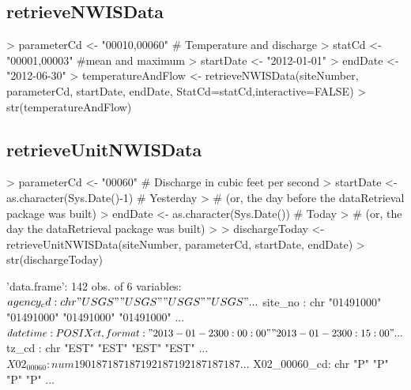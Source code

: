 \documentclass[a4paper,11pt]{article}
\begin{document}
\subsection{retrieveNWISData}
\begin{Schunk}
\begin{Sinput}
> parameterCd <- "00010,00060"  # Temperature and discharge
> statCd <- "00001,00003"  #mean and maximum
> startDate <- "2012-01-01"
> endDate <- "2012-06-30"
> temperatureAndFlow <- retrieveNWISData(siteNumber, parameterCd, 
        startDate, endDate, StatCd=statCd,interactive=FALSE)
> str(temperatureAndFlow)
\end{Sinput}
\end{Schunk}

\subsection{retrieveUnitNWISData}
\begin{Schunk}
\begin{Sinput}
> parameterCd <- "00060"  # Discharge in cubic feet per second
> startDate <- as.character(Sys.Date()-1) # Yesterday 
>   # (or, the day before the dataRetrieval package was built)
> endDate <- as.character(Sys.Date()) # Today 
>   # (or, the day the dataRetrieval package was built)
> 
> dischargeToday <- retrieveUnitNWISData(siteNumber, parameterCd, startDate, endDate)
> str(dischargeToday)
\end{Sinput}
\begin{Soutput}
'data.frame':	142 obs. of  6 variables:
 $ agency_cd   : chr  "USGS" "USGS" "USGS" "USGS" ...
 $ site_no     : chr  "01491000" "01491000" "01491000" "01491000" ...
 $ datetime    : POSIXct, format: "2013-01-23 00:00:00" "2013-01-23 00:15:00" ...
 $ tz_cd       : chr  "EST" "EST" "EST" "EST" ...
 $ X02_00060   : num  190 187 187 187 192 187 192 187 187 187 ...
 $ X02_00060_cd: chr  "P" "P" "P" "P" ...
\end{Soutput}
\end{Schunk}
\end{document}
